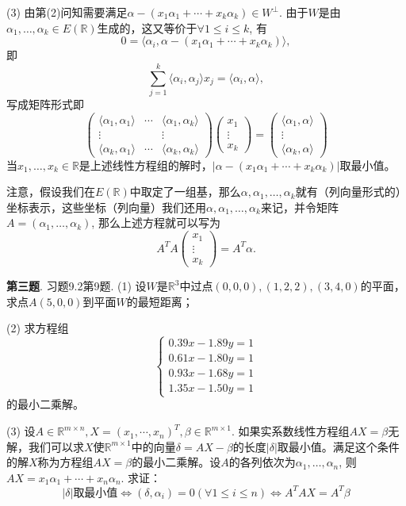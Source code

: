 (3) 由第(2)问知需要满足$\alpha - (x_1\alpha_1 + \cdots + x_k\alpha_k) \in W^{\perp}$. 由于$W$是由$\alpha_1, \ldots, \alpha_k \in E(\mathbb{R})$生成的，这又等价于$\forall 1 \leqslant i \leqslant k$, 有
$$0 = \langle \alpha_i, \alpha - (x_1\alpha_1 + \cdots + x_k\alpha_k) \rangle,$$
即
$$\sum\limits_{j=1}^k \langle \alpha_i, \alpha_j \rangle x_j = \langle \alpha_i, \alpha \rangle,$$
写成矩阵形式即
$$
\begin{pmatrix}
\langle \alpha_1, \alpha_1 \rangle & \cdots & \langle \alpha_1, \alpha_k \rangle \\
\vdots & & \vdots \\
\langle \alpha_k, \alpha_1 \rangle & \cdots & \langle \alpha_k, \alpha_k \rangle
\end{pmatrix}
\begin{pmatrix}
x_1 \\ \vdots \\ x_k
\end{pmatrix} = 
\begin{pmatrix}
\langle \alpha_1, \alpha \rangle \\
\vdots \\
\langle \alpha_k, \alpha \rangle
\end{pmatrix}
$$
当$x_1, \ldots, x_k \in \mathbb{R}$是上述线性方程组的解时，$\lvert \alpha - (x_1\alpha_1 + \cdots + x_k\alpha_k) \rvert$取最小值。

注意，假设我们在$E(\mathbb{R})$中取定了一组基，那么$\alpha, \alpha_1, \ldots, \alpha_k$就有（列向量形式的）坐标表示，这些坐标（列向量）我们还用$\alpha, \alpha_1, \ldots, \alpha_k$来记，并令矩阵$A = (\alpha_1, \ldots, \alpha_k)$, 那么上述方程就可以写为
$$A^TA \begin{pmatrix} x_1 \\ \vdots \\ x_k \end{pmatrix} = A^T \alpha.$$


\newpageorvspace


{\bf 第三题}. 习题9.2第9题. (1) 设$W$是$\mathbb{R}^3$中过点$(0,0,0), (1,2,2), (3,4,0)$的平面，求点$A (5,0,0)$到平面$W$的最短距离；

(2) 求方程组
$$
\begin{cases}
0.39x - 1.89y = 1 \\
0.61x - 1.80y = 1 \\
0.93x - 1.68y = 1 \\
1.35x - 1.50y = 1
\end{cases}
$$
的最小二乘解。

(3) 设$A\in\mathbb{R}^{m\times n}, X = (x_1,\cdots,x_n)^T, \beta\in\mathbb{R}^{m\times 1}$. 如果实系数线性方程组$AX = \beta$无解，我们可以求$X$使$\mathbb{R}^{m\times 1}$中的向量$\delta = AX - \beta$的长度$\lvert \delta \rvert$取最小值。满足这个条件的解$X$称为方程组$AX = \beta$的最小二乘解。设$A$的各列依次为$\alpha_1, \ldots, \alpha_n$, 则$AX = x_1\alpha_1 + \cdots + x_n\alpha_n$. 求证：
$$\lvert \delta \rvert \text{取最小值} \Longleftrightarrow (\delta, \alpha_i) = 0 (\forall 1\leqslant i \leqslant n) \Longleftrightarrow A^TAX = A^T\beta$$

